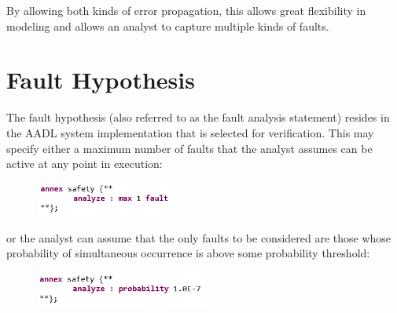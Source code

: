 By allowing both kinds of error propagation, this allows great flexibility in modeling and allows an analyst to capture multiple kinds of faults. 


\section{Fault Hypothesis}
The fault hypothesis (also referred to as the fault analysis statement) resides in the AADL system implementation that is selected for verification. This may specify either a maximum number of faults that the analyst assumes can be active at any point in execution:

\begin{figure}[h!]
	\vspace{-0.1in}
		\includegraphics[width=0.4\textwidth]{images/hypothesisMaxN.png}
	\vspace{-0.1in}
	\label{fig:hypothesisMaxN}
\end{figure}
or the analyst can assume that the only faults to be considered are those whose probability of simultaneous occurrence is above some probability threshold: 

\begin{figure}[h!]
	\vspace{-0.1in}
		\includegraphics[width=0.5\textwidth]{images/hypothesisProb.png}
	\vspace{-0.1in}
\end{figure}

